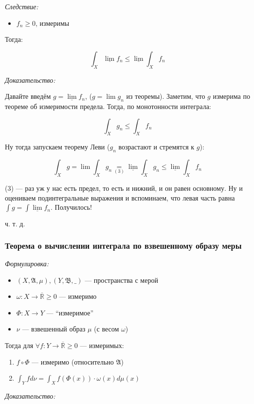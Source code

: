 \documentclass{article}
\def\rinf{\overline{\mathbb{R}}}
\begin{document}
\textit{Следствие: }

\begin{itemize}
    \item $f_n \ge 0$, измеримы
\end{itemize}

Тогда:

\[\int_{X} \underline{\lim}f_n \le \underline{\lim}\int_{X} f_n\]


\textit{Доказательство: }

Давайте введём $g = \underline{\lim} f_n$, ($g = \lim g_n$ из теоремы). Заметим, что $g$ измерима по теореме об измеримости предела. Тогда, по монотонности интеграла:

\[\int_{X} g_n \le \int_{X} f_n\]

Ну тогда запускаем теорему Леви ($g_n$ возрастают и стремятся к $g$):

\[\int_{X} g = \lim \int_{X} g_n \underset{(3)}{=}  \underline{\lim} \int_{X} g_n \le \underline{\lim} \int_{X} f_n\]

(3) --- раз уж у нас есть предел, то есть и нижний, и он равен основному. Ну и оцениваем подинтегральные выражения и вспоминаем, что левая часть равна $\int g = \int \underline{\lim} f_n$. Получилось!

ч. т. д. 

\subsubsection{Теорема о вычислении интеграла по взвешенному образу меры}
\textit{Формулировка:}

\begin{itemize}
    \item $(X, \mathfrak{A}, \mu), (Y, \mathfrak{B}, \_)$ --- пространства с мерой
    \item $\omega: X \rightarrow \rinf \ge 0$ --- измеримо
    \item $\Phi: X \rightarrow Y$ --- ``измеримое''
    \item $\nu$ --- взвешенный образ $\mu$ (с весом $\omega$)
\end{itemize}

Тогда для $\forall f: Y \rightarrow \rinf \ge 0$ --- измеримых:
\begin{enumerate}
    \item $f \circ \Phi$ --- измеримо (относительно $\mathfrak{A}$)
    \item $\int_{Y} f d\nu = \int_{X} f(\Phi(x))\cdot\omega(x) d\mu(x)$
\end{enumerate}
\textit{Доказательство:}
\end{document}
